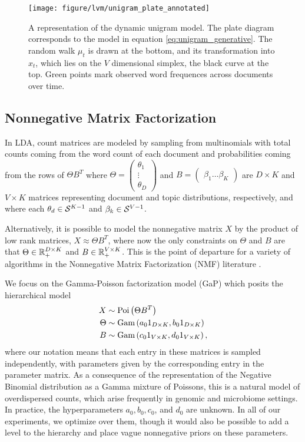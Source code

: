 \begin{figure}
  \centering
  \texttt{[image: figure/lvm/unigram\_plate\_annotated]}
  \caption{A representation of the dynamic unigram model. The plate diagram
    corresponds to the model in equation \ref{eq:unigram_generative}. The random
    walk $\mu_{t}$ is drawn at the bottom, and its transformation into $x_{t}$,
    which lies on the $V$ dimensional simplex, the black curve at the top.
    Green points mark observed word frequences across documents over
    time. \label{fig:unigram_plate_annotated}}
\end{figure}

\subsection{Nonnegative Matrix Factorization}
\label{sec:nmf}

In LDA, count matrices are modeled by sampling from multinomials with total
counts coming from the word count of each document and probabilities
coming from the rows of $\Theta B^{T}$ where $\Theta = \begin{pmatrix}\theta_{1}
  \\ \vdots \\ \theta_{D} \end{pmatrix}$ and $B = \begin{pmatrix} \beta_{1}
  \dots \beta_{K} \end{pmatrix}$ are $D \times K$ and $V \times K$ matrices
representing document and topic distributions, respectively, and where each
$\theta_{d} \in \mathcal{S}^{K - 1}$ and $\beta_{k} \in \mathcal{S}^{V - 1}$.

Alternatively, it is possible to model the nonnegative matrix $X$ by the product
of low rank matrices, $X \approx \Theta B^{T}$, where now the only constraints
on $\Theta$ and $B$ are that $\Theta \in \mathbb{R}_{+}^{D \times K}$ and $B \in
\mathbb{R}_{+}^{V \times K}$. This is the point of departure for a variety of algorithms
in the Nonnegative Matrix Factorization (NMF) literature
\citep{wang2013nonnegative}.

We focus on the Gamma-Poisson factorization model (GaP) \citep{canny2004gap}
which posits the hierarchical model
\begin{align}
  X &\sim \textnormal{Poi}\left(\Theta B^{T}\right) \label{eq:nmf_generative} \\
  \Theta &\sim \textnormal{Gam}\left(a_{0} 1_{D \times K}, b_{0} 1_{D \times K}\right) \nonumber \\
  B &\sim \textnormal{Gam}\left(c_{0} 1_{V \times K}, d_{0} 1_{V \times K} \right), \nonumber
\end{align}
where our notation means that each entry in these matrices is sampled
independently, with parameters given by the corresponding entry in the parameter
matrix. As a consequence of the representation of the Negative Binomial
distribution as a Gamma mixture of Poissons, this is a natural model of
overdispersed counts, which arise frequently in genomic and microbiome settings.
In practice, the hyperparameters $a_{0}, b_{0}, c_{0}$, and $d_{0}$ are unknown.
In all of our experiments, we optimize over them, though it would also be
possible to add a level to the hierarchy and place vague nonnegative priors on
these parameters.

